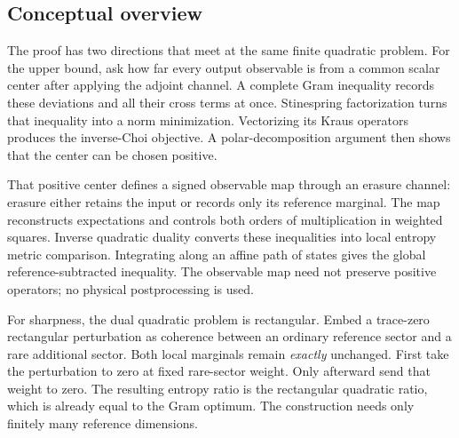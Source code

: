 \documentclass[11pt]{article}
\numberwithin{equation}{section}
\theoremstyle{definition}
\theoremstyle{remark}
\begin{document}
\clearpage
\subsection{Conceptual overview}
\label{sec:overview}

The proof has two directions that meet at the same finite quadratic problem.
For the upper bound, ask how far every output observable is from a common scalar
center after applying the adjoint channel. A complete Gram inequality records
these deviations and all their cross terms at once. Stinespring factorization
turns that inequality into a norm minimization. Vectorizing its Kraus operators
produces the inverse-Choi objective. A polar-decomposition argument then shows
that the center can be chosen positive.

That positive center defines a signed observable map through an erasure channel:
erasure either retains the input or records only its reference marginal. The map
reconstructs expectations and controls both orders of multiplication in weighted
squares. Inverse quadratic duality converts these inequalities into local entropy
metric comparison. Integrating along an affine path of states gives the global
reference-subtracted inequality. The observable map need not preserve positive
operators; no physical postprocessing is used.

For sharpness, the dual quadratic problem is rectangular. Embed a trace-zero
rectangular perturbation as coherence between an ordinary reference sector and a
rare additional sector. Both local marginals remain \emph{exactly} unchanged.
First take the perturbation to zero at fixed rare-sector weight. Only afterward
send that weight to zero. The resulting entropy ratio is the rectangular
quadratic ratio, which is already equal to the Gram optimum. The construction
needs only finitely many reference dimensions.
\end{document}
